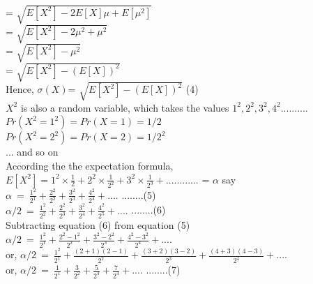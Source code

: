 \documentclass{llncs}
\begin{document}
= $ \sqrt{E[X^2 ]- 2 E[X] \mu + E[\mu ^ 2]} $\\

= $ \sqrt{E[X^2 ]- 2 \mu^2 + \mu ^ 2} $\\

= $ \sqrt{E[X^2 ]- \mu ^ 2} $\\

= $ \sqrt{E[X^2 ]- (E[X]) ^ 2} $\\

Hence, $\sigma(X)$=  $ \sqrt{E[X^2 ]- (E[X]) ^ 2} $	(4)\\

$X^2$ is also a random variable, which takes the values $1^2, 2^2, 3^2, 4^2..........$\\

$Pr(X^2=1^2) = Pr(X=1) = 1/2$\\

$Pr(X^2=2^2) = Pr(X=2) = 1/2^2$\\

... and so on \\

According the the expectation formula, $E[X^2] = 1^2 \times \frac{1}{2} + 2^2 \times \frac{1}{2^2} + 3^2 \times \frac{1}{2^3} + ............  $ = $\alpha$ say\\

$\alpha\ =\ \frac{1^2}{2^1} + \frac{2^2}{2^2} + \frac{3^2}{2^3} + \frac{4^2}{2^4} + .... $   \hspace{5mm} ........(5) \\	


$\alpha/2\ =\ \frac{1^2}{2^2} + \frac{2^2}{2^3} + \frac{3^2}{2^4} + \frac{4^2}{2^5} + .... $   \hspace{5mm} ........(6)  \\

Subtracting equation (6) from equation (5)\\

$\alpha/2\ =\ \frac{1^2}{2^1} + \frac{2^2-1^2}{2^2} + \frac{3^2-2^2}{2^3} + \frac{4^2-3^2}{2^4} + .... $    \\


or, $\alpha/2\ =\ \frac{1^2}{2^1} + \frac{(2+1)(2-1)}{2^2} + \frac{(3+2)(3-2)}{2^3} + \frac{(4+3)(4-3)}{2^4} + .... $    \\


or, $\alpha/2\ =\ \frac{1}{2^1} + \frac{3}{2^2} + \frac{5}{2^3} + \frac{7}{2^4} + .... $     \hspace{5mm} ........(7)\\	
\end{document}
